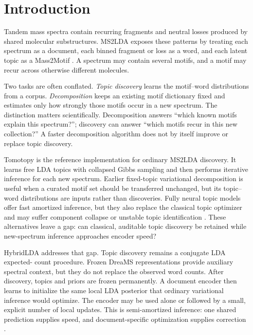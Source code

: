 \documentclass[11pt]{article}
\begin{document}
\section{Introduction}

Tandem mass spectra contain recurring fragments and neutral losses produced by
shared molecular substructures. MS2LDA exposes these patterns by treating each
spectrum as a document, each binned fragment or loss as a word, and each latent
topic as a Mass2Motif \cite{vanderhooft2016}. A spectrum may contain several
motifs, and a motif may recur across otherwise different molecules.

Two tasks are often conflated. \emph{Topic discovery} learns the motif--word
distributions from a corpus. \emph{Decomposition} keeps an existing motif
dictionary fixed and estimates only how strongly those motifs occur in a new
spectrum. The distinction matters scientifically. Decomposition answers
``which known motifs explain this spectrum?''; discovery can answer ``which
motifs recur in this new collection?'' A faster decomposition algorithm does
not by itself improve or replace topic discovery.

Tomotopy is the reference implementation for ordinary MS2LDA discovery. It learns free LDA topics
with collapsed Gibbs sampling and then performs iterative inference for each
new spectrum. Earlier fixed-topic variational decomposition is useful when a
curated motif set should be transferred unchanged, but its topic--word
distributions are inputs rather than discoveries. Fully neural topic models
offer fast amortized inference, but they also replace the classical topic
optimizer and may suffer component collapse or unstable topic identification
\cite{srivastava2017}. These alternatives leave a gap: can classical,
auditable topic discovery be retained while new-spectrum inference approaches
encoder speed?

HybridLDA addresses that gap. Topic discovery remains a conjugate LDA expected-
count procedure. Frozen DreaMS representations \cite{bushuiev2026} provide
auxiliary spectral context, but they do not replace the observed word counts.
After discovery, topics and priors are frozen permanently. A document encoder
then learns to initialize the same local LDA posterior that ordinary
variational inference would optimize. The encoder may be used alone or followed
by a small, explicit number of local updates. This is semi-amortized inference:
one shared prediction supplies speed, and document-specific optimization
supplies correction \cite{cremer2018,kim2018}.
\end{document}
